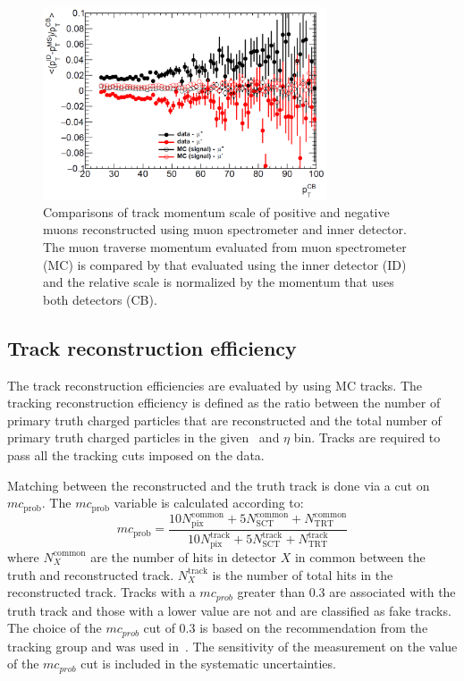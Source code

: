 \begin{figure}[h]
\centerline{
\includegraphics[width=0.75\textwidth]{figures_corrections/MuonPerf.pdf}
}
\caption{Comparisons of track momentum scale of positive and negative muons reconstructed using muon spectrometer and inner detector. The muon traverse momentum evaluated from muon spectrometer (MC) is compared by that evaluated using the inner detector (ID) and the relative scale is normalized by the momentum that uses both detectors (CB). \cite{Bold:2194917}}
\label{Fig:ChMomentumScale}
\end{figure}



\subsection{Track reconstruction efficiency}
\label{sec:trackreco}

The track reconstruction efficiencies are evaluated by using MC tracks. The tracking reconstruction efficiency is defined as the ratio between the number of primary truth charged particles that are reconstructed and the total number of primary truth charged particles in the given \pt\ and $\eta$ bin. Tracks are required to pass all the tracking cuts imposed on the data. 

Matching between the reconstructed and the truth track is done via a cut on $mc_{\mathrm{prob}}$. The $mc_{\mathrm{prob}}$ variable is calculated according to:
\begin{equation}
mc_{\mathrm{prob}} = \frac{10N^{\mathrm{common}}_{\mathrm{pix}} + 5N^{\mathrm{common}}_{\mathrm{SCT}} + N^{\mathrm{common}}_{\mathrm{TRT}}}{10N^{\mathrm{track}}_{\mathrm{pix}} + 5 N^{\mathrm{track}}_{\mathrm{SCT}} + N^{\mathrm{track}}_{\mathrm{TRT}}
\label{eq:mc_prob}}
\end{equation}
 where $N^{\mathrm{common}}_X$  are the number of hits in detector $X$ in common between the truth and reconstructed track.  $N^{\mathrm{track}}_X$ is the number
of total hits in the reconstructed track.  
Tracks with a $mc_{prob}$ greater than 0.3 are associated with the truth track and those with a lower value are not and are classified as fake tracks. The choice of the $mc_{prob}$ cut of 0.3 is based on the recommendation from the tracking group and was used in~\cite{ATL-COM-PHYS-2016-1707}. The sensitivity of the measurement on the value of the $mc_{prob}$ cut is included in the systematic uncertainties.

